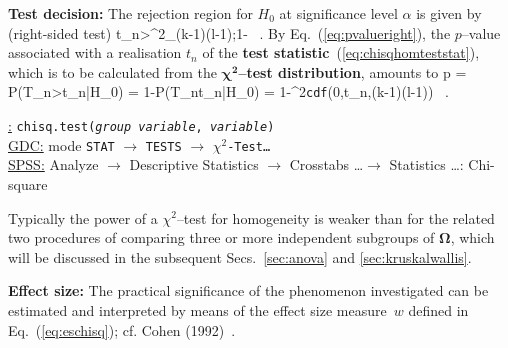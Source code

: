 \medskip
\noindent
\textbf{Test decision:} The rejection region for $H_{0}$ at 
significance level $\alpha$ is given by (right-sided test)
%
\be
t_{n}>\chi^{2}_{(k-1)\times(l-1);1-\alpha} \ .
\ee
%
By Eq.~(\ref{eq:pvalueright}), the $p$--value associated with a 
realisation $t_{n}$ of the \textbf{test
statistic}~(\ref{eq:chisqhomteststat}), which is to
be calculated from the $\boldsymbol{\chi^{2}}$\textbf{--test
distribution}, amounts to
%
\be
p = P(T_{n}>t_{n}|H_{0}) = 1-P(T_{n}\leq t_{n}|H_{0})
= 1-\chi^{2}\texttt{cdf}\left(0,t_{n},(k-1)\times(l-1)\right) \ .
\ee
%

\medskip
\noindent
\underline{\R:} \texttt{chisq.test(\textit{group variable},
\textit{variable})} \\
\underline{GDC:} mode \texttt{STAT} $\rightarrow$ \texttt{TESTS}
$\rightarrow$ \texttt{$\chi^{2}$-Test\ldots}\\
\underline{SPSS:} Analyze $\rightarrow$ Descriptive Statistics
$\rightarrow$ Crosstabs \ldots $\rightarrow$ Statistics \ldots:
Chi-square

\medskip
\noindent
Typically the power of a $\chi^{2}$--test for homogeneity is 
weaker than for the related two procedures of comparing three or
more independent subgroups of $\boldsymbol{\Omega}$, which will be 
discussed in the subsequent Secs.~\ref{sec:anova} and 
\ref{sec:kruskalwallis}.

\medskip
\noindent
\textbf{Effect size:} The practical significance of the phenomenon investigated can be estimated and interpreted by means of the
effect size measure~$w$ defined in Eq.~(\ref{eq:eschisq});
cf. Cohen (1992)~.

